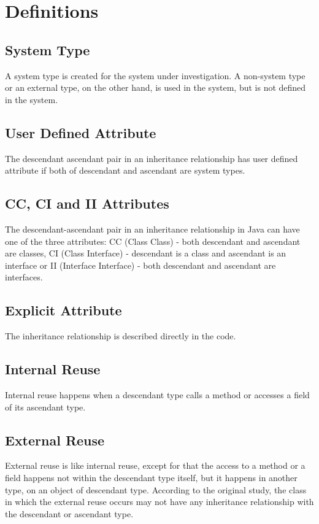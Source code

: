 \documentclass [11pt, parskip=full] {article}
\begin{document}
\section{Definitions}

\subsection{System Type}
A system type is created for the system under investigation. A non-system type or an external type, on the other hand, is used in the system, but is not defined in the system.

\subsection{User Defined Attribute}
The descendant ascendant pair in an inheritance relationship has user defined attribute if both of descendant and ascendant are system types. 


\subsection{CC, CI and II Attributes}
The descendant-ascendant pair in an inheritance relationship in Java can have one of the three attributes: CC (Class Class) - both descendant and ascendant are classes, CI (Class Interface) - descendant is a class and ascendant is an interface or II (Interface Interface) - both descendant and ascendant are interfaces. 

\subsection{Explicit Attribute}
The inheritance relationship is described directly in the code. 

\subsection{Internal Reuse}
Internal reuse happens when a descendant type calls a method or accesses a field of its ascendant type. 

\subsection{External Reuse}
External reuse is like internal reuse, except for that the access to a method or a field happens not within the descendant type itself, but it happens in another type, on an object of descendant type. According to the original study, the class in which the external reuse occurs may not have any inheritance relationship with the descendant or ascendant type.
\end{document}
